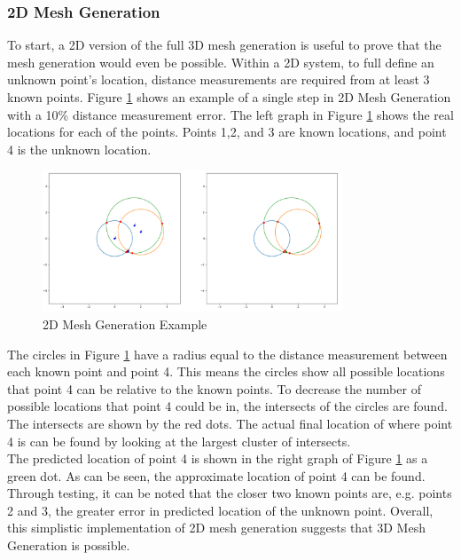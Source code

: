 \subsubsection{2D Mesh Generation}
To start, a 2D version of the full 3D mesh generation is useful to prove that the mesh generation would even be possible. Within a 2D system, to full define an unknown point's location, distance measurements are required from at least 3 known points. Figure \ref{fig:2d_mesh_ex} shows an example of a single step in 2D Mesh Generation with a 10\% distance measurement error. The left graph in Figure \ref{fig:2d_mesh_ex} shows the real locations for each of the points. Points 1,2, and 3 are known locations, and point 4 is the unknown location.

\begin{figure}[H]
	\centering
	\noindent\includegraphics[width=0.8\textwidth]{images/2d_mesh_example.png}
	\caption{2D Mesh Generation Example}
	\label{fig:2d_mesh_ex}
\end{figure}

The circles in Figure \ref{fig:2d_mesh_ex} have a radius equal to the distance measurement between each known point and point 4. This means the circles show all possible locations that point 4 can be relative to the known points. To decrease the number of possible locations that point 4 could be in, the intersects of the circles are found. The intersects are shown by the red dots. The actual final location of where point 4 is can be found by looking at the largest cluster of intersects.\\

The predicted location of point 4 is shown in the right graph of Figure \ref{fig:2d_mesh_ex} as a green dot. As can be seen, the approximate location of point 4 can be found. Through testing, it can be noted that the closer two known points are, e.g. points 2 and 3, the greater error in predicted location of the unknown point. Overall, this simplistic implementation of 2D mesh generation suggests that 3D Mesh Generation is possible.

